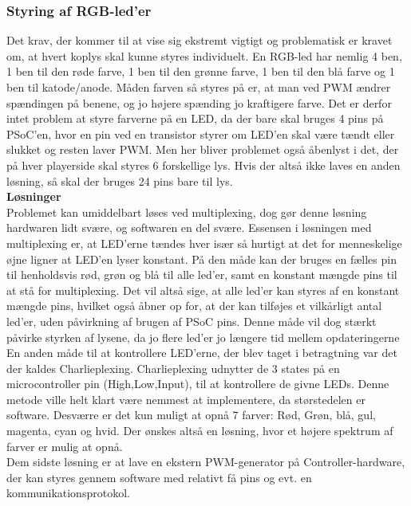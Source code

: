 \documentclass[HardwareDesign/HardwareDesign_main.tex]{subfiles}
\begin{document}
\subsubsection{Styring af RGB-led'er}
Det krav, der kommer til at vise sig ekstremt vigtigt og problematisk er kravet om, at hvert koplys skal kunne styres individuelt. En RGB-led har nemlig 4 ben, 1 ben til den røde farve, 1 ben til den grønne farve, 1 ben til den blå farve og 1 ben til katode/anode. Måden farven så styres på er, at man ved PWM ændrer spændingen på benene, og jo højere spænding jo kraftigere farve. Det er derfor intet problem at styre farverne på en LED, da der bare skal bruges 4 pins på PSoC'en, hvor en pin ved en transistor styrer om LED'en skal være tændt eller slukket og resten laver PWM. Men her bliver problemet også åbenlyst i det, der på hver playerside skal styres 6 forskellige lys. Hvis der altså ikke laves en anden løsning, så skal der bruges 24 pins bare til lys.\\

\textbf{Løsninger}\\
Problemet kan umiddelbart løses ved multiplexing, dog gør denne løsning hardwaren lidt svære, og softwaren en del svære. Essensen i løsningen med multiplexing er, at LED'erne tændes hver især så hurtigt at det for menneskelige øjne ligner at LED'en lyser konstant. På den måde kan der bruges en fælles pin til henholdsvis rød, grøn og blå til alle led'er, samt en konstant mængde pins til at stå for multiplexing. Det vil altså sige, at alle led'er kan styres af en konstant mængde pins, hvilket også åbner op for, at der kan tilføjes et vilkårligt antal led'er, uden påvirkning af brugen af PSoC pins. Denne måde vil dog stærkt påvirke styrken af lysene, da jo flere led'er jo længere tid mellem opdateringerne\\
En anden måde til at kontrollere LED'erne, der blev taget i betragtning var det der kaldes Charlieplexing. Charlieplexing udnytter de 3 states på en microcontroller pin (High,Low,Input), til at kontrollere de givne LEDs. Denne metode ville helt klart være nemmest at implementere, da størstedelen er software. Desværre er det kun muligt at opnå 7 farver: Rød, Grøn, blå, gul, magenta, cyan og hvid. Der ønskes altså en løsning, hvor et højere spektrum af farver er mulig at opnå.\\
Dem sidste løsning er at lave en ekstern PWM-generator på Controller-hardware, der kan styres gennem software med relativt få pins og evt. en kommunikationsprotokol. 
\end{document}
